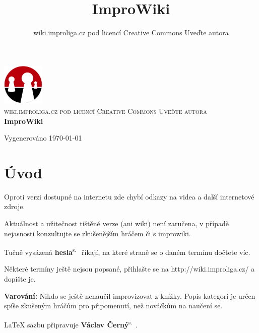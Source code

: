 \documentclass[a4paper,10pt,openany]{book}
\title{ImproWiki}
\author{wiki.improliga.cz pod licencí Creative Commons Uveďte autora}
\newcommand{\odkaz}[2]{\textbf{#1}\textsuperscript{s.~\pageref{#2}}}
\begin{document}
\begin{titlepage}
\begin{center}

\includegraphics[width=0.15\textwidth]{./improliga}~\\[5cm]

\textsc{\Large wiki.improliga.cz pod licencí Creative Commons Uveďte autora }\\[0.5cm]

\HRule %
{ \huge \bfseries ImproWiki \\[0.4cm] }

\HRule %


\vfill

{\large Vygenerováno \today}

\end{center}




\end{titlepage}
 
\chapter{Úvod}\label{úvod}

 

Oproti verzi dostupné na internetu zde chybí odkazy na videa a další internetové zdroje.

Aktuálnost a užitečnost tištěné verze (ani wiki) není zaručena, v případě nejasností konzultujte se zkušenějším hráčem či s improwiki.

Tučně vysázená \odkaz{hesla}{úvod} říkají, na které straně se o daném termínu dočtete víc.

Některé termíny ještě nejsou popsané, přihlašte se na http://wiki.improliga.cz/ a dopište je.

\textbf{Varování:} Nikdo se ještě nenaučil improvizovat z knížky. Popis kategorí je určen spíše zkušeným hráčům pro připomenutí, než nováčkům na naučení se.  

\LaTeX{} sazbu připravuje  \odkaz{Václav Černý}{uživatel:vatoz}.
\end{document}
